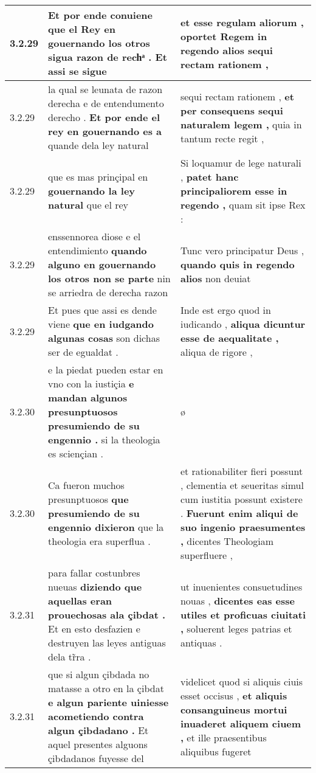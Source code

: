\begin{tabular}{|p{1cm}|p{6.5cm}|p{6.5cm}|}
3.2.29 & Et por ende conuiene \textbf{ que el Rey en gouernando los otros sigua razon de rechͣ . } Et assi se sigue & et esse regulam aliorum , \textbf{ oportet Regem in regendo alios } sequi rectam rationem , \\\hline
3.2.29 & la qual se leunata de razon derecha e de entendumento derecho . \textbf{ Et por ende el rey en gouernando es a } quande dela ley natural & sequi rectam rationem , \textbf{ et per consequens sequi naturalem legem , } quia in tantum recte regit , \\\hline
3.2.29 & que es mas prinçipal en \textbf{ gouernando la ley natural } que el rey & Si loquamur de lege naturali , \textbf{ patet hanc principaliorem esse in regendo , } quam sit ipse Rex : \\\hline
3.2.29 & enssennorea diose e el entendimiento \textbf{ quando alguno en gouernando los otros non se parte } nin se arriedra de derecha razon & Tunc vero principatur Deus , \textbf{ quando quis in regendo alios } non deuiat \\\hline
3.2.29 & Et pues que assi es dende viene \textbf{ que en iudgando algunas cosas } son dichas ser de egualdat . & Inde est ergo quod in iudicando , \textbf{ aliqua dicuntur esse de aequalitate , } aliqua de rigore , \\\hline
3.2.30 & e la piedat pueden estar en vno con la iustiçia \textbf{ e mandan algunos presunptuosos presumiendo de su engennio . } si la theologia es sciençian . & ø \\\hline
3.2.30 & Ca fueron muchos presunptuosos \textbf{ que presumiendo de su engennio dixieron } que la theologia era superflua . & et rationabiliter fieri possunt , clementia et seueritas simul cum iustitia possunt existere . \textbf{ Fuerunt enim aliqui de suo ingenio praesumentes , } dicentes Theologiam superfluere , \\\hline
3.2.31 & para fallar costunbres nueuas \textbf{ diziendo que aquellas eran prouechosas ala çibdat . } Et en esto desfazien e destruyen las leyes antiguas dela tr̃ra . & ut inuenientes consuetudines nouas , \textbf{ dicentes eas esse utiles et proficuas ciuitati , } soluerent leges patrias et antiquas . \\\hline
3.2.31 & que si algun çibdada no matasse a otro en la çibdat \textbf{ e algun pariente uiniesse acometiendo contra algun çibdadano . } Et aquel presentes alguons çibdadanos fuyesse del & videlicet quod si aliquis ciuis esset occisus , \textbf{ et aliquis consanguineus mortui inuaderet aliquem ciuem , } et ille praesentibus aliquibus fugeret \\\hline

\end{tabular}
